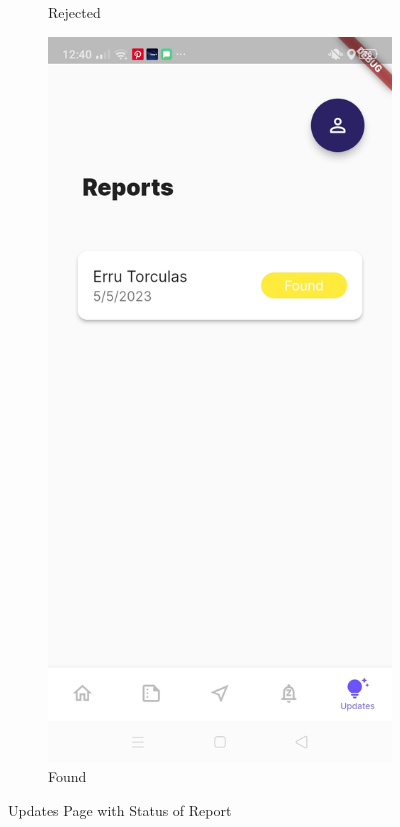 \begin{figure}[!h]
\begin{subfigure}[c]{0.20\linewidth}
        \caption{Rejected}
        \label{fig:StatusRejected}
    \end{subfigure}
        \centering
    \begin{subfigure}[c]{0.20\linewidth}
        \centering
        \includegraphics[scale=0.10]{figures/Chapter4/Main/Report-4.jpg}
        \caption{Found}
        \label{fig:StatusFound}
    \end{subfigure}
    \caption{Updates Page with Status of Report}
    \label{fig:userReportStatus}
\end{figure}

